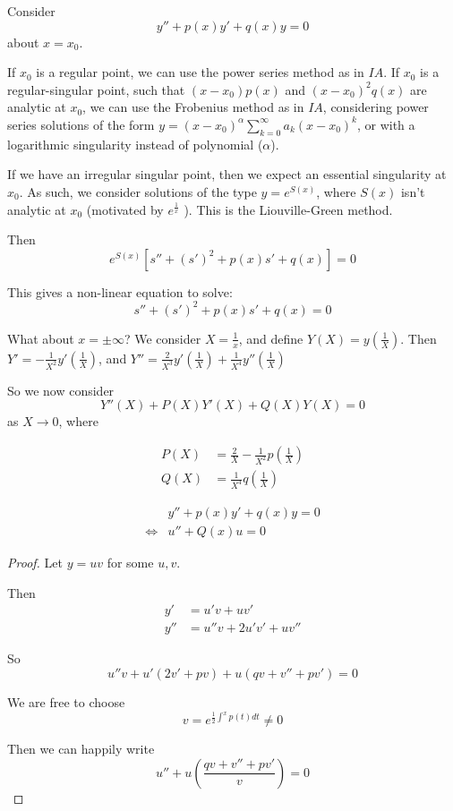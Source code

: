 \documentclass[a4paper]{article}
\begin{document}
Consider 
\[
	y'' + p(x) y' + q(x) y = 0
\] about $x=x_0$.

If $x_0$ is a regular point, we can use the power series method as in $IA$. If $x_0$ is a regular-singular point, such that $(x-x_0)p(x)$ and $(x-x_0)^2 q(x)$ are analytic at $x_0$, we can use the Frobenius method as in $IA$, considering power series solutions of the form $y = (x-x_0)^{\alpha} \sum_{k=0}^{\infty} a_k (x-x_0)^{k}$, or with a logarithmic singularity instead of polynomial ($\alpha$).

If we have an irregular singular point, then we expect an essential singularity at  $x_0$. As such, we consider solutions of the type $y = e^{S(x)}$, where $S(x)$ isn't analytic at $x_0$ (motivated by $e^{\frac{1}{x}}$ ). This is the Liouville-Green method.

Then 
 \[
	 e^{S(x)} \left[ s'' + (s')^2 + p(x) s' + q(x) \right] = 0
\] 

This gives a non-linear equation to solve:
\[
	s'' + (s')^2 + p(x) s' + q(x) = 0
\]

What about $x = \pm \infty$? We consider $X= \frac{1}{x}$, and define $Y(X) = y(\frac{1}{X})$. Then $Y' = -\frac{1}{X^2} y'(\frac{1}{X})$, and $Y'' = \frac{2}{X^3} y'(\frac{1}{X}) + \frac{1}{X^{4}} y''(\frac{1}{X})$ 

So we now consider
\[
	Y''(X) + P(X) Y'(X) + Q(X)Y(X) = 0
\] as $X \to 0$, where

\begin{align*}
	P(X) &= \frac{2}{X}-\frac{1}{X^2} p(\frac{1}{X}) \\
	Q(X) &= \frac{1}{X^{4}} q(\frac{1}{X})
\end{align*}

\begin{prop}
	\begin{align*}
		& y'' + p(x) y' + q(x) y = 0 \\
		\iff & u''  + Q(x)u = 0
	\end{align*}
\end{prop}

\begin{proof}
	Let $y = uv$ for some  $u,v$.

	Then  \begin{align*}
		y'& = u'v + uv' \\
		y'' &= u''v + 2u'v' + uv''
	\end{align*}

	So 
	\[
		u''v + u' (2v' + pv) + u(qv + v'' + pv') = 0
	\]

	We are free to choose
	 \[
		 v = e^{\frac{1}{2}\int ^{x} p(t) dt} \neq 0
	\] 

	Then we can happily write
	\[
		u'' + u\left( \frac{qv + v'' + pv'}{v} \right) = 0
	\] 
\end{proof}
\end{document}
